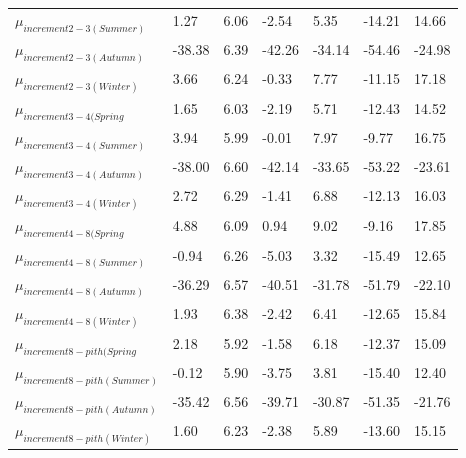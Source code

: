 \documentclass{article}\usepackage[]{graphicx}\usepackage[]{color}
\begin{document}
\begin{table}[ht]
\begin{tabular}{|p{}|p{}|p{}|p{}|p{}|p{}|p{}|}
  $\mu_{increment 2-3 (Summer)}$ & 1.27 & 6.06 & -2.54 & 5.35 & -14.21 & 14.66 \\ 
  $\mu_{increment 2-3 (Autumn)}$ & -38.38 & 6.39 & -42.26 & -34.14 & -54.46 & -24.98 \\ 
  $\mu_{increment 2-3 (Winter)}$ & 3.66 & 6.24 & -0.33 & 7.77 & -11.15 & 17.18 \\ 
  $\mu_{increment 3-4 (Spring}$ & 1.65 & 6.03 & -2.19 & 5.71 & -12.43 & 14.52 \\ 
  $\mu_{increment 3-4 (Summer)}$ & 3.94 & 5.99 & -0.01 & 7.97 & -9.77 & 16.75 \\ 
  $\mu_{increment 3-4 (Autumn)}$ & -38.00 & 6.60 & -42.14 & -33.65 & -53.22 & -23.61 \\ 
  $\mu_{increment 3-4 (Winter)}$ & 2.72 & 6.29 & -1.41 & 6.88 & -12.13 & 16.03 \\ 
  $\mu_{increment 4-8 (Spring}$ & 4.88 & 6.09 & 0.94 & 9.02 & -9.16 & 17.85 \\ 
  $\mu_{increment 4-8 (Summer)}$ & -0.94 & 6.26 & -5.03 & 3.32 & -15.49 & 12.65 \\ 
  $\mu_{increment 4-8 (Autumn)}$ & -36.29 & 6.57 & -40.51 & -31.78 & -51.79 & -22.10 \\ 
  $\mu_{increment 4-8 (Winter)}$ & 1.93 & 6.38 & -2.42 & 6.41 & -12.65 & 15.84 \\ 
  $\mu_{increment 8-pith (Spring}$ & 2.18 & 5.92 & -1.58 & 6.18 & -12.37 & 15.09 \\ 
  $\mu_{increment 8-pith (Summer)}$ & -0.12 & 5.90 & -3.75 & 3.81 & -15.40 & 12.40 \\ 
  $\mu_{increment 8-pith (Autumn)}$ & -35.42 & 6.56 & -39.71 & -30.87 & -51.35 & -21.76 \\ 
  $\mu_{increment 8-pith (Winter)}$ & 1.60 & 6.23 & -2.38 & 5.89 & -13.60 & 15.15 \\ 
   \hline
\end{tabular}
\endgroup
\end{table}
\end{document}
